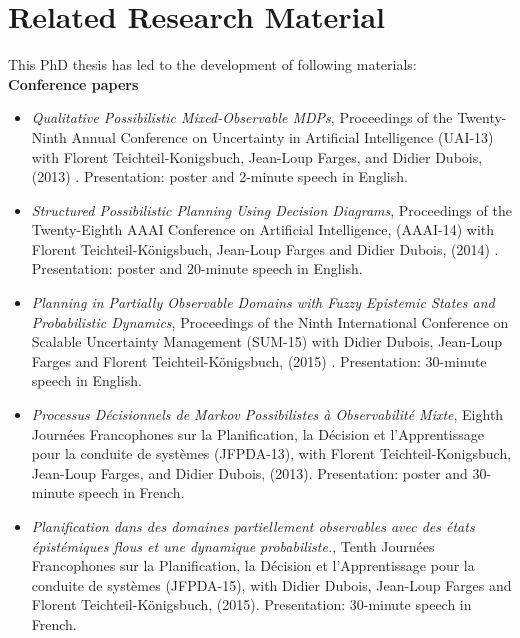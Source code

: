 \chapter*{Related Research Material}

This PhD thesis has led to the development of following materials:\\

\textbf{Conference papers}
\begin{itemize}
\item \textit{Qualitative {P}ossibilistic {M}ixed-{O}bservable {MDP}s}, 
Proceedings of the Twenty-Ninth Annual Conference on Uncertainty in Artificial Intelligence (UAI-13) 
with Florent Teichteil-Konigsbuch, Jean-Loup Farges, and Didier Dubois, (2013) \cite{Drougard13}. Presentation: poster and 2-minute speech in English.
\item \textit{Structured Possibilistic Planning Using Decision Diagrams}, 
Proceedings of the Twenty-Eighth {AAAI} Conference on Artificial Intelligence,
(AAAI-14) with Florent Teichteil{-}K{\"{o}}nigsbuch, Jean-Loup Farges and Didier Dubois,
(2014) \cite{DBLP:conf/aaai/DrougardTFD14}. Presentation: poster and 20-minute speech in English.
\item \textit{Planning in Partially Observable Domains with Fuzzy Epistemic States and Probabilistic Dynamics},
Proceedings of the Ninth International Conference on Scalable Uncertainty Management (SUM-15)
with Didier Dubois, Jean-Loup Farges and Florent Teichteil-K\"onigsbuch, (2015) \cite{DBLP:conf/sum/DrougardDFT15}. Presentation: 30-minute speech in English.
\item \textit{Processus D\'ecisionnels de Markov Possibilistes \`a Observabilit\'e Mixte},
Eighth Journ\'ees Francophones sur la Planification, la D\'ecision et l'Apprentissage pour la conduite de syst\`emes (JFPDA-13),
with Florent Teichteil-Konigsbuch, Jean-Loup Farges, and Didier Dubois, (2013). Presentation: poster and 30-minute speech in French.
\item \textit{Planification dans des domaines partiellement
observables avec des \'etats \'epist\'emiques flous
et une dynamique probabiliste.},
Tenth Journ\'ees Francophones sur la Planification, la D\'ecision et l'Apprentissage pour la conduite de syst\`emes (JFPDA-15),
with Didier Dubois, Jean-Loup Farges and Florent Teichteil-K\"onigsbuch, (2015). Presentation: 30-minute speech in French.
\end{itemize}

